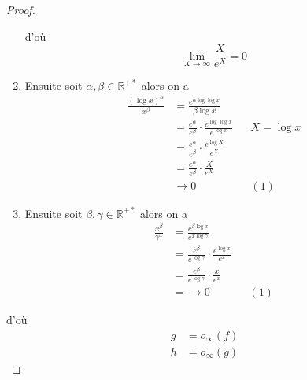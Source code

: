 \documentclass[11pt,colorlinks]{book}
\theoremstyle{mytheoremstyle}
\theoremstyle{mytheoremstyle}
\theoremstyle{mytheoremstyle}
\theoremstyle{mytheoremstyle}
\theoremstyle{mytheoremstyle}
\theoremstyle{mytheoremstyle}
\theoremstyle{mytheoremstyle}
\theoremstyle{mytheoremstyle}
\theoremstyle{myproblemstyle}
\def\mbb#1{\mathbb{#1}}
\def\bR{\mbb{R}}
\begin{document}
\begin{theorem}
\begin{proof}
\begin{enumerate}
\begin{equation*}
          \end{equation*}
          d'où 
          \begin{equation*}
            \lim_{X\to \infty} \frac{X}{e^X} = 0
          \end{equation*}
          \item Ensuite soit $\alpha,\beta \in \bR^{+*}$ alors on a
          \begin{align*}
            \frac{(\log x)^{\alpha}}{x^{\beta}} &= \frac{e^{\alpha \log \log x}}{\beta \log x} \\ 
            &= \frac{e^{\alpha}}{e^{\beta}} \cdot \frac{e^{\log \log x}}{e^{\log x}} && X=\log x \\ 
            &= \frac{e^{\alpha}}{e^{\beta}} \cdot \frac{e^{\log X}}{e^X} \\
            &= \frac{e^{\alpha}}{e^{\beta}} \cdot \frac{X}{e^X} \\
            &\to 0 && (1)
          \end{align*}
          \item Ensuite soit $\beta,\gamma \in \bR^{+*}$ alors on a 
          \begin{align*}
            \frac{x^{\beta}}{\gamma^{x}} &= \frac{e^{\beta \log x}}{e^{x \log \gamma}} \\ 
            &= \frac{e^{\beta}}{e^{\log \gamma}} \cdot \frac{e^{\log x}}{e^x} \\ 
            &= \frac{e^{\beta}}{e^{\log \gamma}} \cdot \frac{x}{e^x} \\ 
            &=\to 0 && (1)
          \end{align*}
        \end{enumerate}
        d'où 
        \begin{align*}
          g &= o_{\infty}(f) \\ 
          h &= o_{\infty}(g)
        \end{align*}
      \end{proof}
    \end{theorem}
\end{document}
